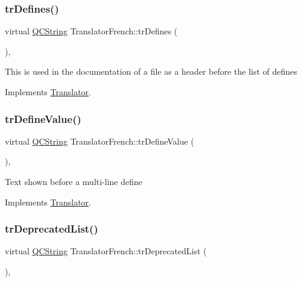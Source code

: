\subsubsection{\texorpdfstring{trDefines()}{trDefines()}}
{\footnotesize\ttfamily virtual \mbox{\hyperlink{class_q_c_string}{Q\+C\+String}} Translator\+French\+::tr\+Defines (\begin{DoxyParamCaption}{ }\end{DoxyParamCaption})\hspace{0.3cm}{\ttfamily [inline]}, {\ttfamily [virtual]}}

This is used in the documentation of a file as a header before the list of defines 

Implements \mbox{\hyperlink{class_translator}{Translator}}.

\mbox{\label{class_translator_french_a4f3a7b5033d6df789134cdec3f5137e8}} 
\subsubsection{\texorpdfstring{trDefineValue()}{trDefineValue()}}
{\footnotesize\ttfamily virtual \mbox{\hyperlink{class_q_c_string}{Q\+C\+String}} Translator\+French\+::tr\+Define\+Value (\begin{DoxyParamCaption}{ }\end{DoxyParamCaption})\hspace{0.3cm}{\ttfamily [inline]}, {\ttfamily [virtual]}}

Text shown before a multi-\/line define 

Implements \mbox{\hyperlink{class_translator}{Translator}}.

\mbox{\label{class_translator_french_a011f1910fc16d54e14576a54c4ff991f}} 
\subsubsection{\texorpdfstring{trDeprecatedList()}{trDeprecatedList()}}
{\footnotesize\ttfamily virtual \mbox{\hyperlink{class_q_c_string}{Q\+C\+String}} Translator\+French\+::tr\+Deprecated\+List (\begin{DoxyParamCaption}{ }\end{DoxyParamCaption})\hspace{0.3cm}{\ttfamily [inline]}, {\ttfamily [virtual]}}

